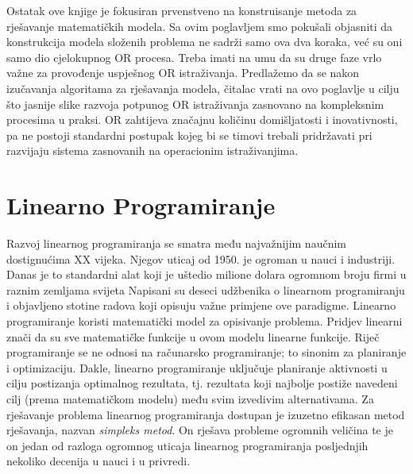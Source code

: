 \documentclass[a4paper, utf8, 11pt, colorlinks]{book}
\begin{document}
Ostatak ove knjige je fokusiran prvenstveno na konstruisanje metoda za rješavanje matematičkih modela. Sa ovim poglavljem  smo  pokušali objasniti da konstrukcija modela složenih problema ne sadrži samo ova dva koraka, već su oni samo dio cjelokupnog OR procesa. Treba imati na umu da su druge faze vrlo važne za provođenje uspješnog OR istraživanja. Predlažemo da se nakon izučavanja algoritama za rješavanja modela, čitalac vrati na ovo poglavlje u cilju što jasnije slike razvoja potpunog OR istraživanja zasnovano na kompleksnim procesima u praksi.  OR zahtijeva značajnu količinu domišljatosti i inovativnosti, pa ne postoji standardni postupak kojeg bi se timovi trebali pridržavati pri razvijaju sistema zasnovanih na operacionim istraživanjima. %
\newpage

\chapter{Linearno Programiranje} 
   
Razvoj linearnog programiranja se smatra među najvažnijim naučnim dostignu\-ćima XX vijeka. Njegov uticaj od 1950. je ogroman u nauci i industriji. Danas je to standardni alat koji je uštedio milione dolara ogromnom broju firmi u raznim zemljama svijeta  Napisani su deseci udžbenika
o linearnom programiranju i objavljeno stotine radova koji opisuju važne primjene ove paradigme.  Linearno programiranje koristi matematički model za opisivanje problema. 
Pridjev linearni znači da su   sve matematičke funkcije u ovom modelu linearne funkcije. Riječ programiranje se ne odnosi na računarsko programiranje; to sinonim za planiranje i optimizaciju. Dakle, linearno programiranje uključuje planiranje aktivnosti u cilju postizanja optimalnog rezultata, tj. rezultata koji najbolje postiže navedeni cilj (prema matematičkom modelu) među svim izvedivim alternativama.  Za rješavanje problema linearnog programiranja dostupan je izuzetno efikasan metod rješavanja, nazvan \emph{simpleks metod}. On rješava probleme ogromnih veličina te je on jedan od razloga ogromnog uticaja linearnog  programiranja posljednjih nekoliko decenija u nauci i u privredi.
\end{document}
